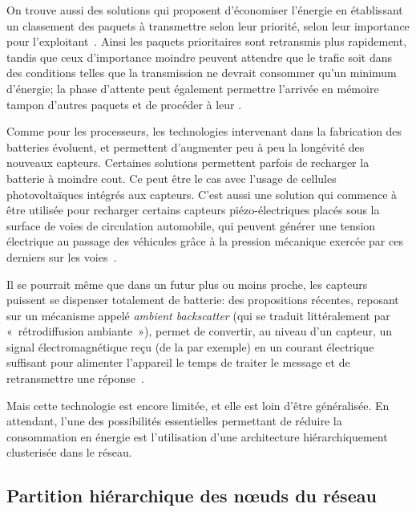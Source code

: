 On trouve aussi des solutions qui proposent d'économiser l'énergie en établissant un classement des paquets à transmettre selon leur priorité, \cad selon leur importance pour l'exploitant~\cite{SAS14}.
Ainsi les paquets prioritaires sont retransmis plus rapidement, tandis que ceux d'importance moindre peuvent attendre que le trafic soit dans des conditions telles que la transmission ne devrait consommer qu'un minimum d'énergie; la phase d'attente peut également permettre l'arrivée en mémoire tampon d'autres paquets et de procéder à leur .

Comme pour les processeurs, les technologies intervenant dans la fabrication des batteries évoluent, et permettent d'augmenter peu à peu la longévité des nouveaux capteurs.
Certaines solutions permettent parfois de recharger la batterie à moindre cout.
Ce peut être le cas avec l'usage de cellules photovoltaïques intégrés aux capteurs.
C'est aussi une solution qui commence à être utilisée pour recharger certains capteurs piézo-électriques placés sous la surface de voies de circulation automobile, qui peuvent générer une tension électrique au passage des véhicules grâce à la pression mécanique exercée par ces derniers sur les voies~\cite{sti}.

Il se pourrait même que dans un futur plus ou moins proche, les capteurs puissent se dispenser totalement de batterie: des propositions récentes, reposant sur un mécanisme appelé \textit{ambient backscatter} (qui se traduit littéralement par « rétrodiffusion ambiante »), permet de convertir, au niveau d'un capteur, un signal électromagnétique reçu (de la \sdb par exemple) en un courant électrique suffisant pour alimenter l'appareil le temps de traiter le message et de retransmettre une réponse~\cite{LPTGWS13}.

Mais cette technologie est encore limitée, et elle est loin d'être généralisée.
En attendant, l'une des possibilités essentielles permettant de réduire la consommation en énergie est l'utilisation d'une architecture  hiérarchiquement clusterisée dans le réseau.

    \subsection{Partition hiérarchique des nœuds du réseau}\label{st:subsec:partition}
